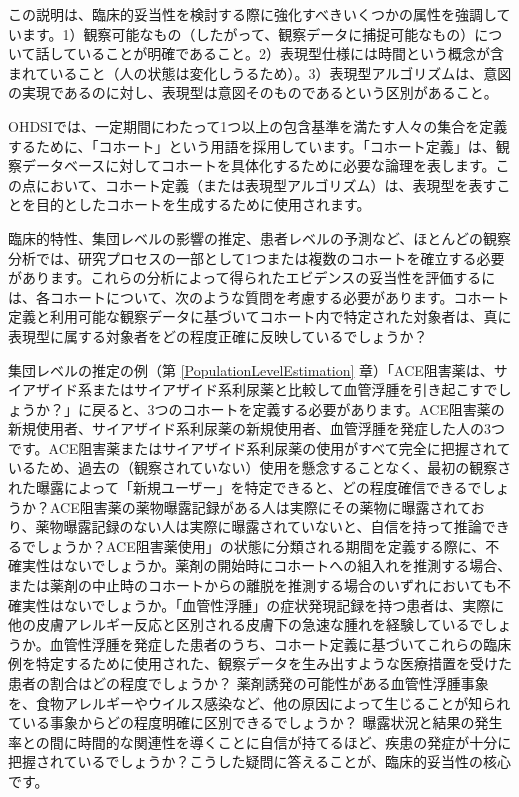 \documentclass[
  11pt]{book}
\theoremstyle{definition}
\theoremstyle{definition}
\theoremstyle{definition}
\theoremstyle{definition}
\theoremstyle{remark}
\begin{document}
この説明は、臨床的妥当性を検討する際に強化すべきいくつかの属性を強調しています。1）観察可能なもの（したがって、観察データに捕捉可能なもの）について話していることが明確であること。2）表現型仕様には時間という概念が含まれていること（人の状態は変化しうるため）。3）表現型アルゴリズムは、意図の実現であるのに対し、表現型は意図そのものであるという区別があること。

OHDSIでは、一定期間にわたって1つ以上の包含基準を満たす人々の集合を定義するために、「コホート」という用語を採用しています。「コホート定義」は、観察データベースに対してコホートを具体化するために必要な論理を表します。この点において、コホート定義（または表現型アルゴリズム）は、表現型を表すことを目的としたコホートを生成するために使用されます。

臨床的特性、集団レベルの影響の推定、患者レベルの予測など、ほとんどの観察分析では、研究プロセスの一部として1つまたは複数のコホートを確立する必要があります。これらの分析によって得られたエビデンスの妥当性を評価するには、各コホートについて、次のような質問を考慮する必要があります。コホート定義と利用可能な観察データに基づいてコホート内で特定された対象者は、真に表現型に属する対象者をどの程度正確に反映しているでしょうか？

集団レベルの推定の例（第 \ref{PopulationLevelEstimation} 章）「ACE阻害薬は、サイアザイド系またはサイアザイド系利尿薬と比較して血管浮腫を引き起こすでしょうか？」に戻ると、3つのコホートを定義する必要があります。ACE阻害薬の新規使用者、サイアザイド系利尿薬の新規使用者、血管浮腫を発症した人の3つです。ACE阻害薬またはサイアザイド系利尿薬の使用がすべて完全に把握されているため、過去の（観察されていない）使用を懸念することなく、最初の観察された曝露によって「新規ユーザー」を特定できると、どの程度確信できるでしょうか？ACE阻害薬の薬物曝露記録がある人は実際にその薬物に曝露されており、薬物曝露記録のない人は実際に曝露されていないと、自信を持って推論できるでしょうか？ACE阻害薬使用」の状態に分類される期間を定義する際に、不確実性はないでしょうか。薬剤の開始時にコホートへの組入れを推測する場合、または薬剤の中止時のコホートからの離脱を推測する場合のいずれにおいても不確実性はないでしょうか。「血管性浮腫」の症状発現記録を持つ患者は、実際に他の皮膚アレルギー反応と区別される皮膚下の急速な腫れを経験しているでしょうか。血管性浮腫を発症した患者のうち、コホート定義に基づいてこれらの臨床例を特定するために使用された、観察データを生み出すような医療措置を受けた患者の割合はどの程度でしょうか？ 薬剤誘発の可能性がある血管性浮腫事象を、食物アレルギーやウイルス感染など、他の原因によって生じることが知られている事象からどの程度明確に区別できるでしょうか？ 曝露状況と結果の発生率との間に時間的な関連性を導くことに自信が持てるほど、疾患の発症が十分に把握されているでしょうか？こうした疑問に答えることが、臨床的妥当性の核心です。
\end{document}
